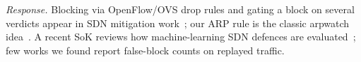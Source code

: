 \emph{Response.} Blocking via OpenFlow/OVS drop rules and gating a block on several verdicts appear in SDN mitigation work~\cite{bawany2017ddos,yan2016sdn}; our ARP rule is the classic arpwatch idea~\cite{arpwatch}. A recent SoK reviews how machine-learning SDN defences are evaluated~\cite{orsdemir2026sok}; few works we found report false-block counts on replayed traffic.
